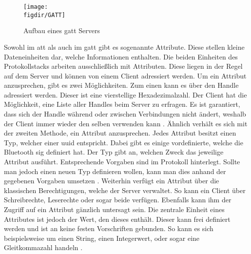 \begin{figure}[h]
	\centering
	\texttt{[image: \\figdir/GATT]}
	\caption{Aufbau eines \ac{gatt} Servers \cite[Seite 57]{Townsend14:GSB}}
	\label{FIG:gatt}
\end{figure}

\noindent Sowohl im \ac{att} als auch im \ac{gatt} gibt es sogenannte Attribute. Diese stellen kleine Dateneinheiten dar, welche Informationen enthalten. Die beiden Einheiten des Protokollstacks arbeiten ausschließlich mit Attributen. Diese liegen in der Regel auf dem Server und können von einem Client adressiert werden. Um ein Attribut anzusprechen, gibt es zwei Möglichkeiten. Zum einen kann es über den Handle adressiert werden. Dieser ist eine vierstellige Hexadezimalzahl. Der Client hat die Möglichkeit, eine Liste aller Handles beim Server zu erfragen. Es ist garantiert, dass sich der Handle während oder zwischen Verbindungen nicht ändert, weshalb der Client immer wieder den selben verwenden kann \cite[Seite 53f]{Townsend14:GSB}. Ähnlich verhält es sich mit der zweiten Methode, ein Attribut anzusprechen. Jedes Attribut besitzt einen Typ, welcher einer \ac{uuid} entspricht. Dabei gibt es einige vordefinierte, welche die Bluetooth \ac{sig} definiert hat. Der Typ gibt an, welchen Zweck das jeweilige Attribut ausführt. Entsprechende Vorgaben sind im Protokoll hinterlegt. Sollte man jedoch einen neuen Typ definieren wollen, kann man dies anhand der gegebenen Vorgaben umsetzen \cite[Seite 31]{Usama17:BBS}. Weiterhin verfügt ein Attribut über die klassischen Berechtigungen, welche der Server verwaltet. So kann ein Client über Schreibrechte, Leserechte oder sogar beide verfügen. Ebenfalls kann ihm der Zugriff auf ein Attribut gänzlich untersagt sein. Die zentrale Einheit eines Attributes ist jedoch der Wert, den dieses enthält. Dieser kann frei definiert werden und ist an keine festen Vorschriften gebunden. So kann es sich beispielsweise um einen String, einen Integerwert, oder sogar eine Gleitkommazahl handeln \cite[Seite 54ff]{Townsend14:GSB}.\\   

